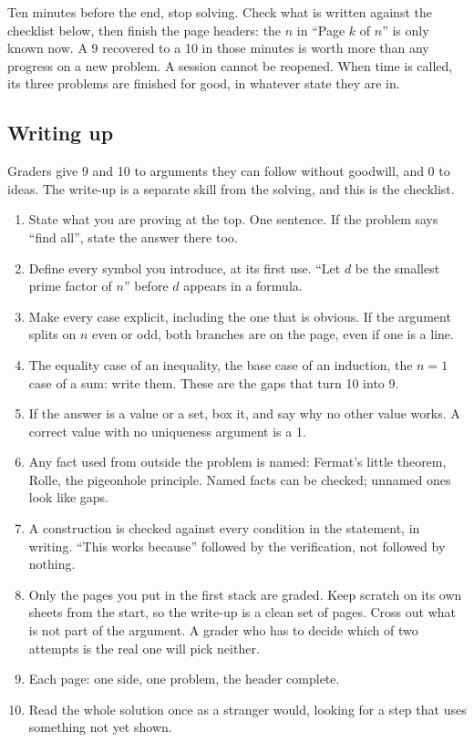 Ten minutes before the end, stop solving. Check what is written against the checklist below, then finish the page headers: the $n$ in ``Page $k$ of $n$'' is only known now. A 9 recovered to a 10 in those minutes is worth more than any progress on a new problem. A session cannot be reopened. When time is called, its three problems are finished for good, in whatever state they are in.

\subsection*{Writing up}

Graders give 9 and 10 to arguments they can follow without goodwill, and 0 to ideas. The write-up is a separate skill from the solving, and this is the checklist.

\begin{enumerate}[nosep,leftmargin=*]
\item State what you are proving at the top. One sentence. If the problem says ``find all'', state the answer there too.
\item Define every symbol you introduce, at its first use. ``Let $d$ be the smallest prime factor of $n$'' before $d$ appears in a formula.
\item Make every case explicit, including the one that is obvious. If the argument splits on $n$ even or odd, both branches are on the page, even if one is a line.
\item The equality case of an inequality, the base case of an induction, the $n = 1$ case of a sum: write them. These are the gaps that turn 10 into 9.
\item If the answer is a value or a set, box it, and say why no other value works. A correct value with no uniqueness argument is a 1.
\item Any fact used from outside the problem is named: Fermat's little theorem, Rolle, the pigeonhole principle. Named facts can be checked; unnamed ones look like gaps.
\item A construction is checked against every condition in the statement, in writing. ``This works because'' followed by the verification, not followed by nothing.
\item Only the pages you put in the first stack are graded. Keep scratch on its own sheets from the start, so the write-up is a clean set of pages. Cross out what is not part of the argument. A grader who has to decide which of two attempts is the real one will pick neither.
\item Each page: one side, one problem, the header complete.
\item Read the whole solution once as a stranger would, looking for a step that uses something not yet shown.
\end{enumerate}


